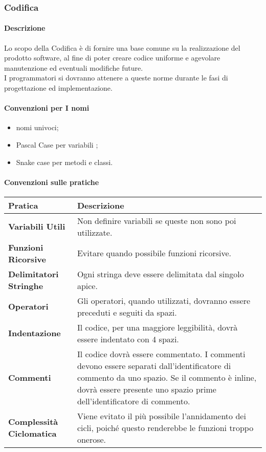 		
		\subsubsection{Codifica} 
		
			\paragraph{Descrizione} \hfill \break
				Lo scopo della Codifica è di fornire una base comune su la realizzazione del prodotto software, al fine di poter creare codice uniforme e agevolare manutenzione ed eventuali modifiche future. \\
				I programmatori si dovranno attenere a queste norme durante le fasi di progettazione ed implementazione. 
			
			\paragraph{Convenzioni per I nomi} 
				\begin{itemize}
					\item nomi univoci;
					\item Pascal Case per variabili ;
					\item Snake case per metodi e classi. %
				\end{itemize}
			
			\paragraph{Convenzioni sulle pratiche} \hfill \break
			\begin{tabular}{ |m{15em}|m{25em}| }
				\hline
				\textbf{Pratica}				& \textbf{Descrizione}\\
				\hline
				\textbf{Variabili Utili}		& Non definire variabili se queste non sono poi utilizzate.\\
				\hline
				\textbf{Funzioni Ricorsive}		& Evitare quando possibile funzioni ricorsive.\\
				\hline
				\textbf{Delimitatori Stringhe}	& Ogni stringa deve essere delimitata dal singolo apice.\\
				\hline
				\textbf{Operatori}				& Gli operatori, quando utilizzati, dovranno essere preceduti e seguiti da spazi.\\
				\hline
				\textbf{Indentazione}			& Il codice, per una maggiore leggibilità, dovrà essere indentato con 4 spazi.\\ %
				\hline
				\textbf{Commenti}				& Il codice dovrà essere commentato. I commenti devono essere separati dall'identificatore di commento da uno spazio. Se il commento è inline, dovrà essere presente uno spazio prime dell'identificatore di commento.\\
				\hline
				\textbf{Complessità Ciclomatica}& Viene evitato il più possibile l'annidamento dei cicli, poiché questo renderebbe le funzioni troppo onerose.\\
				\hline

			\end{tabular}
			
